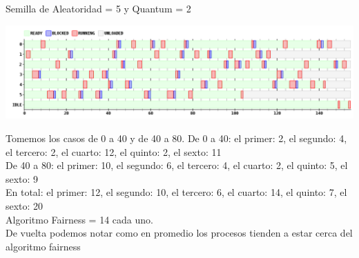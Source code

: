 Semilla de Aleatoridad = 5 y Quantum = 2
\begin {center}
\includegraphics[width=16cm]{../simusched/outputs/ej8/sl-ej8-5-2.png}
\end {center}
Tomemos los casos de 0 a 40 y de 40 a 80.
De 0 a 40: el primer: 2, el segundo: 4, el tercero: 2, el cuarto: 12, el quinto: 2, el sexto: 11 \\
De 40 a 80: el primer: 10, el segundo: 6, el tercero: 4, el cuarto: 2, el quinto: 5, el sexto: 9 \\
En total: el primer: 12, el segundo: 10, el tercero: 6, el cuarto: 14, el quinto: 7, el sexto: 20 \\
Algoritmo Fairness = 14 cada uno.\\
De vuelta podemos notar como en promedio los procesos tienden a estar cerca del algoritmo fairness

